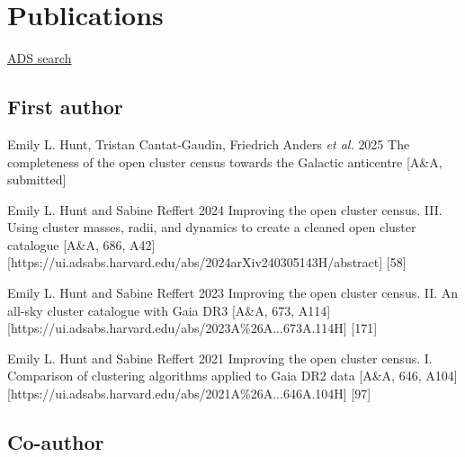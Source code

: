 \section*{Publications}

\href{\cvADSLink}{ADS search \faLink}%


\subsection*{First author}

\begin{etaremune}
    \item \publication
        {Emily L. Hunt, Tristan Cantat-Gaudin, Friedrich Anders \emph{et al.}}
        {2025}
        {The completeness of the open cluster census towards the Galactic anticentre}
        [A\&A, submitted]
    \item \publication
        {Emily L. Hunt and Sabine Reffert}
        {2024}
        {Improving the open cluster census. III. Using cluster masses, radii, and dynamics to create a cleaned open cluster catalogue}
        [A\&A, 686, A42]
        [https://ui.adsabs.harvard.edu/abs/2024arXiv240305143H/abstract]
        [58]
    \item \publication
        {Emily L. Hunt and Sabine Reffert}
        {2023}
        {Improving the open cluster census. II. An all-sky cluster catalogue with Gaia DR3}
        [A\&A, 673, A114]
        [https://ui.adsabs.harvard.edu/abs/2023A\%26A...673A.114H]
        [171]
    \item \publication
        {Emily L. Hunt and Sabine Reffert}
        {2021}
        {Improving the open cluster census. I. Comparison of clustering algorithms applied to Gaia DR2 data}
        [A\&A, 646, A104]
        [https://ui.adsabs.harvard.edu/abs/2021A\%26A...646A.104H]
        [97]
\end{etaremune}


\subsection*{Co-author}

